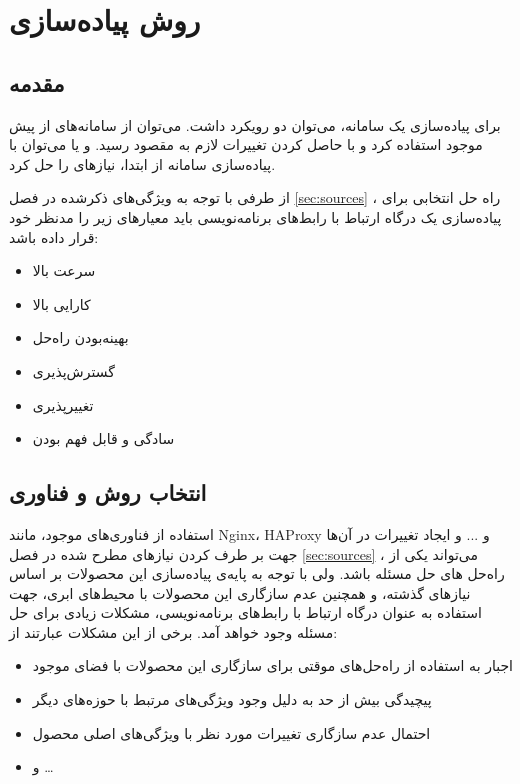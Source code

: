 \section{روش پیاده‌سازی}\label{sec:implementation}

\subsection{مقدمه}\label{subsec:impl_intro}
برای پیاده‌سازی یک سامانه، می‌توان دو رویکرد داشت. می‌توان از سامانه‌های از پیش موجود استفاده کرد و با حاصل کردن تغییرات لازم به مقصود رسید. و یا می‌توان با پیاده‌سازی سامانه از ابتدا، نیاز‌های را حل کرد.

از طرفی با توجه به ویژگی‌های ذکرشده در فصل
\ref{sec:sources}
، راه حل انتخابی برای پیاده‌سازی یک درگاه ارتباط با رابط‌های برنامه‌نویسی باید معیار‌های زیر را مدنظر خود قرار داده باشد:

\begin{itemize}
    \item سرعت بالا
    \item کارایی بالا
    \item بهینه‌بودن راه‌حل
    \item گسترش‌پذیری
    \item تغییر‌پذیری
    \item سادگی و قابل فهم بودن
\end{itemize}

\subsection{انتخاب روش و فناوری}\label{subsec:impl_choose}
استفاده‌ از فناوری‌های موجود، مانند Nginx، HAProxy و ... و ایجاد تغییرات در آن‌ها جهت بر طرف کردن نیاز‌های مطرح شده در فصل
\ref{sec:sources}
، می‌تواند یکی از راه‌حل ‌های حل مسئله باشد. ولی با توجه به پایه‌ی پیاده‌سازی این محصولات بر اساس نیاز‌های گذشته، و همچنین عدم سازگاری این محصولات با محیط‌های ابری، جهت استفاده به عنوان درگاه ارتباط با رابط‌های برنامه‌نویسی، مشکلات زیادی برای حل مسئله وجود خواهد آمد. برخی از این مشکلات عبارتند از:

\begin{itemize}
    \item اجبار به استفاده از راه‌حل‌های موقتی برای سازگاری این محصولات با فضای موجود
    \item پیچیدگی بیش از حد به دلیل وجود ویژگی‌های مرتبط با حوزه‌های دیگر
    \item احتمال عدم سازگاری تغییرات مورد نظر با ویژگی‌های اصلی محصول
    \item و \ldots
\end{itemize}

